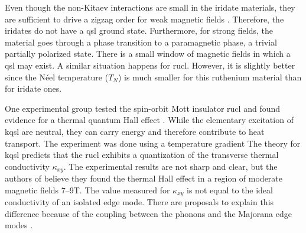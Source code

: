 Even though the non-Kitaev interactions are small in the iridate materials, they are sufficient to drive a zigzag order for weak magnetic fields \cite{Choi-2012,Ye-2012}. Therefore, the iridates do not  have a \acrshort{qsl} ground state. Furthermore, for strong fields, the material goes through a phase transition to a paramagnetic phase, a trivial partially polarized state. %
There is a small window of magnetic fields in which a \acrshort{qsl} may exist. %
A similar situation happens for \acrfull{rucl}. However, it is slightly better since the Néel temperature ($T_N$) is much smaller for this ruthenium material than for iridate ones.

One experimental group tested the spin-orbit Mott insulator \acrshort{rucl} and found evidence for a thermal quantum Hall effect \cite{Kasahara_2018,yokoi2020halfinteger}. %
While the elementary excitation of \acrshort{kqsl} are neutral, they can carry energy and therefore contribute to  heat transport. The experiment was done using a temperature gradient %
The theory for \acrshort{kqsl} predicts that the \acrshort{rucl} exhibits a  quantization of the transverse thermal conductivity $\kappa_{xy}$. The experimental results are not sharp and clear, but the authors of \cite{Kasahara_2018} believe they found the thermal Hall effect in a region of moderate magnetic fields 7--9T.
The value measured for $\kappa_{xy}$ is not equal to the ideal conductivity of an isolated edge mode. There are proposals to explain this difference because of the coupling between the phonons and the Majorana edge modes \cite{Ye_2018,Aviv_2018}.



